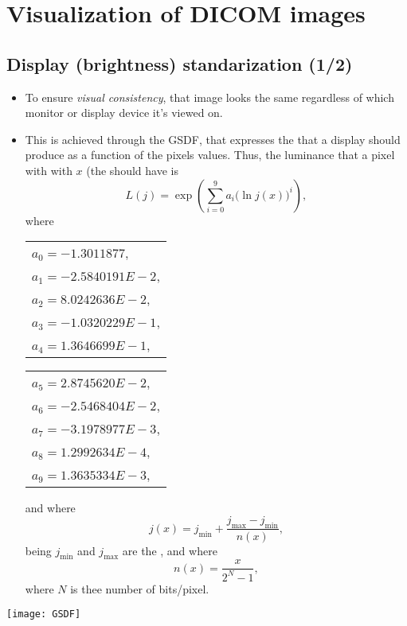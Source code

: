 \chapter{Visualization of \gls{DICOM} images}

\section{Display (brightness) standarization (1/2)}
\begin{itemize}
\item To ensure \emph{visual consistency}, that image looks the same
  regardless of which monitor or display device it's viewed on.
\item This is achieved through the \gls{GSDF}, that expresses the
   that a display should produce as a function
  of the pixels values. Thus, the luminance that a pixel with with
   $x$ (the
  should have is
  \begin{equation}
    L(j) = \exp\left(\sum_{i=0}^{9}a_i\big(\ln j(x)\big)^i\right),
  \end{equation}
  where
  \begin{center}
  \begin{tabular}{l}
    $a_0 = -1.3011877$, \\
    $a_1 = -2.5840191E-2$, \\
    $a_2 = 8.0242636E-2$, \\
    $a_3 = -1.0320229E-1$, \\
    $a_4 = 1.3646699E-1$, \\
  \end{tabular}
  \begin{tabular}{l}
    $a_5 = 2.8745620E-2$, \\
    $a_6 = -2.5468404E-2$,\\
    $a_7 = -3.1978977E-3$, \\
    $a_8 = 1.2992634E-4$, \\
    $a_9 = 1.3635334E-3$,
  \end{tabular}
  \end{center}
  and where
  \begin{equation}
    j(x) = j_{\text{min}} + \frac{j_{\text{max}} - j_{\text{min}}}{n(x)},
  \end{equation}
  being $j_{\text{min}}$ and $j_{\text{max}}$ are the , and where
  \begin{equation}
    n(x) = \frac{x}{2^N-1},
  \end{equation}
  where $N$ is thee number of bits/pixel.
\end{itemize}
\begin{center}
  \texttt{[image: GSDF]}
\end{center}

